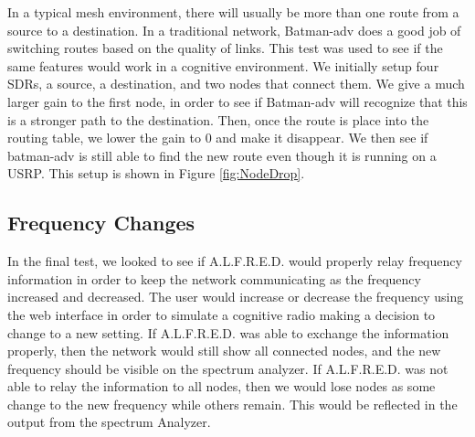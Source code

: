 In a typical mesh environment, there will usually be more than one route from a source to a destination. In a traditional network, Batman-adv does a good job of switching routes based on the quality of links. This test was used to see if the same features would work in a cognitive environment. We initially setup four SDRs, a source, a destination, and two nodes that connect them. We give a much larger gain to the first node, in order to see if Batman-adv will recognize that this is a stronger path to the destination. Then, once the route is place into the routing table, we lower the gain to 0 and make it disappear. We then see if batman-adv is still able to find the new route even though it is running on a USRP. This setup is shown in Figure \ref{fig:NodeDrop}.



\subsection{Frequency Changes}

In the final test, we looked to see if A.L.F.R.E.D. would properly relay frequency information in order to keep the network communicating as the frequency increased and decreased. The user would increase or decrease the frequency using the web interface in order to simulate a cognitive radio making a decision to change to a new setting. If A.L.F.R.E.D. was able to exchange the information properly, then the network would still show all connected nodes, and the new frequency should be visible on the spectrum analyzer. If A.L.F.R.E.D. was not able to relay the information to all nodes, then we would lose nodes as some change to the new frequency while others remain. This would be reflected in the output from the spectrum Analyzer. 